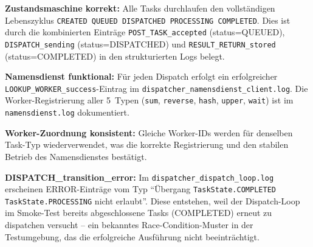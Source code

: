 \documentclass[a4paper,12pt]{article}
\begin{document}
\textbf{Zustandsmaschine korrekt:} Alle Tasks durchlaufen den vollständigen Lebenszyklus
\texttt{CREATED \textrightarrow{} QUEUED \textrightarrow{} DISPATCHED \textrightarrow{} PROCESSING \textrightarrow{} COMPLETED}.
Dies ist durch die kombinierten Einträge \texttt{POST\_TASK\_accepted} (status=QUEUED),
\texttt{DISPATCH\_sending} (status=DISPATCHED) und \texttt{RESULT\_RETURN\_stored} (status=COMPLETED)
in den strukturierten Logs belegt.

\textbf{Namensdienst funktional:} Für jeden Dispatch erfolgt ein erfolgreicher
\texttt{LOOKUP\_WORKER\_success}-Eintrag im \texttt{dispatcher\_namensdienst\_client.log}.
Die Worker-Registrierung aller 5~Typen (\texttt{sum}, \texttt{reverse}, \texttt{hash}, \texttt{upper}, \texttt{wait})
ist im \texttt{namensdienst.log} dokumentiert.

\textbf{Worker-Zuordnung konsistent:} Gleiche Worker-IDs werden für denselben Task-Typ wiederverwendet,
was die korrekte Registrierung und den stabilen Betrieb des Namensdienstes bestätigt.

\textbf{DISPATCH\_transition\_error:} Im \texttt{dispatcher\_dispatch\_loop.log} erscheinen ERROR-Einträge
vom Typ \enquote{Übergang \texttt{TaskState.COMPLETED} \textrightarrow{} \texttt{TaskState.PROCESSING} nicht erlaubt}.
Diese entstehen, weil der Dispatch-Loop im Smoke-Test bereits abgeschlossene Tasks (COMPLETED) erneut
zu dispatchen versucht -- ein bekanntes Race-Condition-Muster in der Testumgebung, das die erfolgreiche
Ausführung nicht beeinträchtigt.
\end{document}
